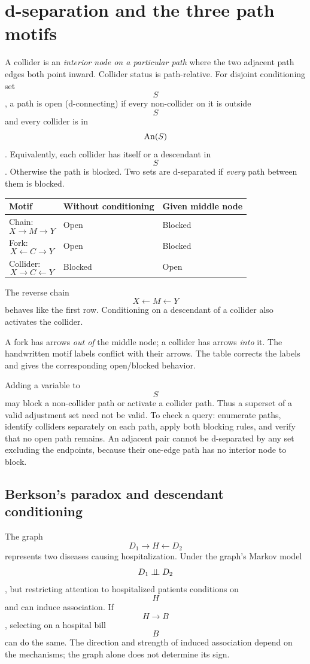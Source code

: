 \section{d-separation and the three path motifs}
A collider is an \emph{interior node on a particular path} where the two adjacent path edges both point inward. Collider status is path-relative. For disjoint conditioning set $$S$$, a path is open (d-connecting) if every non-collider on it is outside $$S$$ and every collider is in $$\operatorname{An}(S)$$. Equivalently, each collider has itself or a descendant in $$S$$. Otherwise the path is blocked. Two sets are d-separated if \emph{every} path between them is blocked.
\begin{center}
\begin{tabular}{lll}\toprule
Motif & Without conditioning & Given middle node\\\midrule
Chain: $$X\to M\to Y$$ & Open & Blocked\\
Fork: $$X\leftarrow C\to Y$$ & Open & Blocked\\
Collider: $$X\to C\leftarrow Y$$ & Blocked & Open\\\bottomrule
\end{tabular}
\end{center}
The reverse chain $$X\leftarrow M\leftarrow Y$$ behaves like the first row. Conditioning on a descendant of a collider also activates the collider.
\begin{correction}
A fork has arrows \emph{out of} the middle node; a collider has arrows \emph{into} it. The handwritten motif labels conflict with their arrows. The table corrects the labels and gives the corresponding open/blocked behavior.
\end{correction}
\begin{supplement}
Adding a variable to $$S$$ may block a non-collider path or activate a collider path. Thus a superset of a valid adjustment set need not be valid. To check a query: enumerate paths, identify colliders separately on each path, apply both blocking rules, and verify that no open path remains. An adjacent pair cannot be d-separated by any set excluding the endpoints, because their one-edge path has no interior node to block.
\end{supplement}
\subsection{Berkson's paradox and descendant conditioning}
The graph $$D_1\to H\leftarrow D_2$$ represents two diseases causing hospitalization. Under the graph's Markov model $$D_1\mathrel{\perp\!\!\!\perp} D_2$$, but restricting attention to hospitalized patients conditions on $$H$$ and can induce association. If $$H\to B$$, selecting on a hospital bill $$B$$ can do the same. The direction and strength of induced association depend on the mechanisms; the graph alone does not determine its sign.


